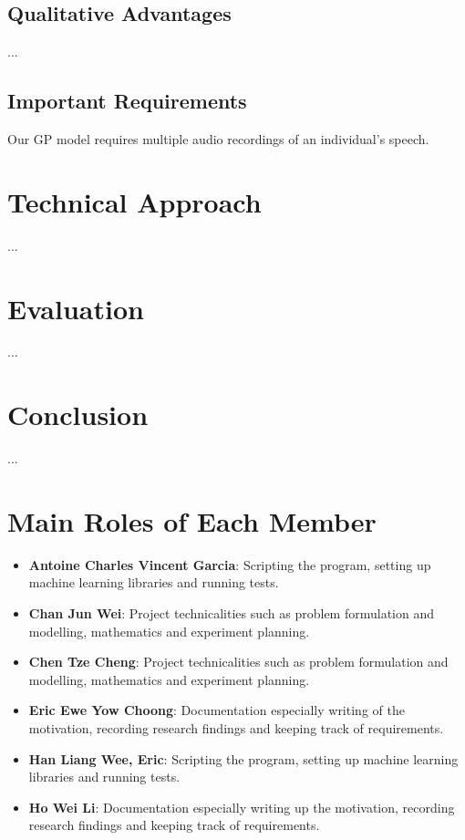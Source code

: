 \documentclass{article}
\begin{document}
	\subsection{Qualitative Advantages}
	... \\

	\subsection{Important Requirements}
	 Our GP model requires multiple audio recordings of an individual's speech. \\

	\section{Technical Approach}
	... \\	

	\section{Evaluation}
	... \\

	\section{Conclusion}	
	... \\

	\section{Main Roles of Each Member}
	\begin{itemize}
		\item \textbf{Antoine Charles Vincent Garcia}: 
		Scripting the program, setting up machine learning libraries and running tests.
		\item \textbf{Chan Jun Wei}: 
		Project technicalities such as problem formulation and modelling, mathematics and experiment planning.
		\item \textbf{Chen Tze Cheng}: 
		Project technicalities such as problem formulation and modelling, mathematics and experiment planning.
		\item \textbf{Eric Ewe Yow Choong}: 
		Documentation especially writing of the motivation, recording research findings and keeping track of requirements.
		\item \textbf{Han Liang Wee, Eric}: 
		Scripting the program, setting up machine learning libraries and running tests.
		\item \textbf{Ho Wei Li}: 
		Documentation especially writing up the motivation, recording research findings and keeping track of requirements.
	\end{itemize}
	
\end{document}
